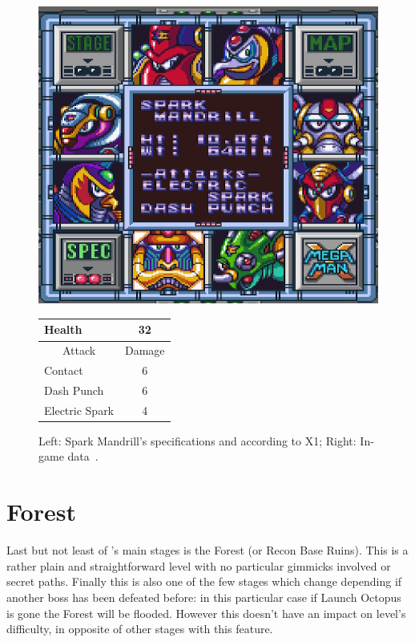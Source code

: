 \begin{figure}[htp]
	\begin{minipage}[c]{0.45\linewidth}
		\vspace{0pt}
		\centering
		\includegraphics[width=\linewidth]{figures/X1/Spark_mandrill/Spark_mandril_specs.png}
	\end{minipage}
	\begin{minipage}[c]{0.45\linewidth}
		\centering
		\vspace{0pt}
		\begin{tabular}[h]{l c}
			\toprule
			Health  & 32\\
			\midrule
			\multicolumn{1}{c}{Attack} & \multicolumn{1}{c}{Damage}\\
			Contact & 6\\
			Dash Punch& 6\\
			Electric Spark & 4\\
			\bottomrule
		\end{tabular}
	\end{minipage}
	\caption{Left: Spark Mandrill's specifications and according to X1; Right: In-game data~\cite{wiki:Spark_mandrill}. }
	\label{Mandrill_specs}
\end{figure}

\chapter{Forest}
Last but not least of \x's main stages is the Forest (or Recon Base Ruins). This is a rather plain and straightforward level with no particular gimmicks involved or secret paths. Finally this is also one of the few stages which change depending if another boss has been defeated before: in this particular case if Launch Octopus is gone the Forest will be flooded. However this doesn't have an impact on level's difficulty, in opposite of other stages with this feature.

